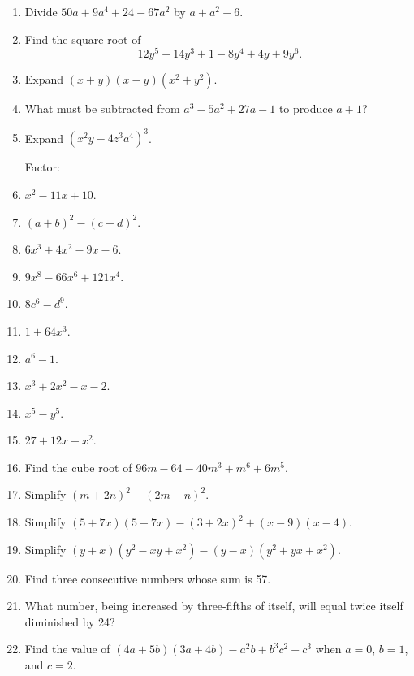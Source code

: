 \documentclass{book}
\begin{document}
\begin{enumerate}
\item Divide $50a+9a^4+24-67a^2$ by $a+a^2-6$.

\item Find the square root of
\[
12y^5-14y^3+1-8y^4+4y+9y^6.
\]

\item Expand $(x+y)(x-y)(x^2+y^2)$.

\item What must be subtracted from $a^3-5a^2+27a-1$ to produce
$a+1$?

\item Expand $\left(x^2y-4z^3a^4\right)^3$.

Factor:

\item $x^2-11x+10$.

\item $\left(a+b\right)^2-\left(c+d\right)^2$.

\item $6x^3+4x^2-9x-6$.

\item $9x^8-66x^6+121x^4$.

\item $8c^6-d^9$.

\item $1+64x^3$.

\item $a^6-1$.

\item $x^3+2x^2-x-2$.

\item $x^5-y^5$.

\item $27+12x+x^2$.

\item Find the cube root of $96m-64-40m^3+m^6+6m^5$.

\item Simplify $\left(m+2n\right)^2-\left(2m-n\right)^2$.

\item Simplify $(5+7x)(5-7x)-\left(3+2x\right)^2+(x-9)(x-4)$.

\item Simplify $(y+x)(y^2-xy+x^2)-(y-x)(y^2+yx+x^2)$.

\item Find three consecutive numbers whose sum is 57.

\item What number, being increased by three-fifths of itself, will
equal twice itself diminished by 24?

\item Find the value of $(4a + 5b) (3a+4b)-a^2b+b^3c^2-c^3$ when
$a = 0$, $b = 1$, and $c = 2$.
\end{enumerate}
\end{document}
